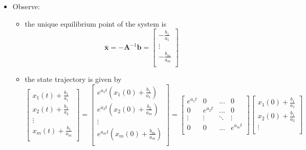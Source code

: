 \documentclass[12pt,a4paper]{article}
\begin{document}
\begin{itemize}
\begin{itemize}
  \item Observe:
    \begin{itemize}
    \item the unique equilibrium point of the system is
      \begin{equation}\nonumber%
        \bar{\bm{x}}
        =
        -\bm{A}^{-1}\bm{b}
        =
      \begin{bmatrix}
        -\frac{b_{1}}{a_{1}} \\
        \vdots \\
        -\frac{b_{m}}{a_{m}} \\
      \end{bmatrix}
      \end{equation}
    \item the state trajectory is given by
      \begin{equation}\nonumber%
        \begin{bmatrix}
          x_{1}(t) + \frac{b_{1}}{a_{1}} \\
          x_{2}(t) + \frac{b_{1}}{a_{2}} \\
          \vdots \\
          x_{m}(t) + \frac{b_{1}}{a_{m}}\\
        \end{bmatrix}
        =
        \begin{bmatrix}
          e^{a_{1}t} \left( x_{1}(0) + \frac{b_{1}}{a_{1}}\right) \\
          e^{a_{2}t} \left( x_{2}(0) + \frac{b_{2}}{a_{m}}\right) \\
          \vdots \\
          e^{a_{m}t} \left( x_{m}(0) + \frac{b_{m}}{a_{m}}\right) \\
        \end{bmatrix}
        = 
        \begin{bmatrix}
          e^{a_{1}t} & 0 & \ldots & 0 \\
          0 & e^{a_{2}t} & \ldots & 0 \\
          \vdots & \vdots & \ddots & \vdots \\
          0 & 0 & \ldots & e^{a_{m}t} \\
        \end{bmatrix}
        \begin{bmatrix}
          x_{1}(0) + \frac{b_{1}}{a_{1}} \\
          x_{2}(0) + \frac{b_{1}}{a_{2}} \\
          \vdots \\

\end{bmatrix}
\end{equation}
\end{itemize}
\end{itemize}
\end{itemize}
\end{document}

